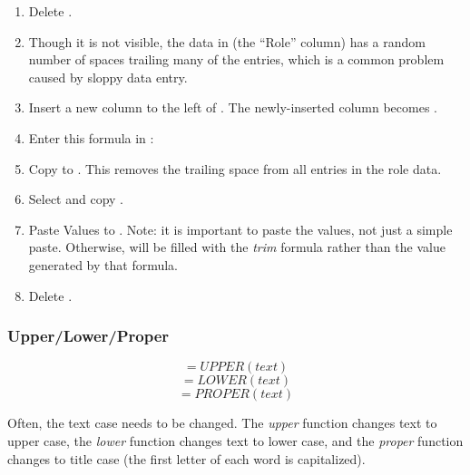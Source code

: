 \begin{enumerate}
	\item Delete .
	\item Though it is not visible, the data in  (the ``Role'' column) has a random number of spaces trailing many of the entries, which is a common problem caused by sloppy data entry.
	\item Insert a new column to the left of . The newly-inserted column becomes .
	\item Enter this formula in : 
	\item Copy  to . This removes the trailing space from all entries in the role data.
	\item Select and copy .
	\item Paste Values to . Note: it is important to paste the values, not just a simple paste. Otherwise,  will be filled with the \textit{trim} formula rather than the value generated by that formula.
	\item Delete .
\end{enumerate}

\subsubsection{Upper/Lower/Proper}

\[ =UPPER(text) \]
\[ =LOWER(text) \]
\[ =PROPER(text) \]

Often, the text case needs to be changed. The \textit{upper} function changes text to upper case, the \textit{lower} function changes text to lower case, and the \textit{proper} function changes to title case (the first letter of each word is capitalized). 

